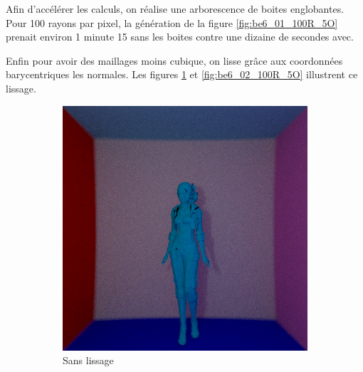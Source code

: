 \documentclass[12pt,a4paper,twoside]{report}
\begin{document}
Afin d'accélérer les calculs, on réalise une arborescence de boites englobantes. Pour 100 rayons par pixel, la génération de la figure \ref{fig:be6_01_100R_5O} prenait environ 1 minute 15 sans les boites contre une dizaine de secondes avec.

Enfin pour avoir des maillages moins cubique, on lisse grâce aux coordonnées barycentriques les normales. Les figures \ref{fig:be6_01_100R_5O_1} et \ref{fig:be6_02_100R_5O} illustrent ce lissage.

\begin{figure}[H]
	\centering
	\begin{subfigure}{.45\textwidth}
		\centering
		\includegraphics[width=1.\linewidth]{be6_01_100R_5O_75s}
		\caption{Sans lissage}
		\label{fig:be6_01_100R_5O_1}
	\end{subfigure}
	\begin{subfigure}{.45\textwidth}
		\centering

\end{subfigure}
\end{figure}
\end{document}
